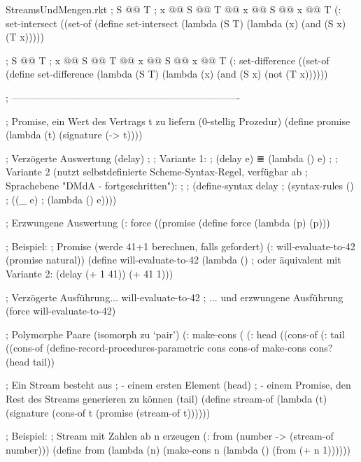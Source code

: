 \begin{filecontents*}{StreamsUndMengen.rkt}
; S @\latexcode{$\cap$}@ T
; x @\latexcode{$\in$}@ S @\latexcode{$\cap$}@ T @\latexcode{$\Leftrightarrow$}@ x @\latexcode{$\in$}@ S @\latexcode{$\land$}@ x @\latexcode{$\in$}@ T
(: set-intersect ((set-of %
(define set-intersect
  (lambda (S T)
    (lambda (x)
      (and (S x) (T x)))))

; S @\latexcode{$\setminus$}@ T
; x @\latexcode{$\in$}@ S @\latexcode{$\setminus$}@ T @\latexcode{$\Leftrightarrow$}@ x @\latexcode{$\in$}@ S @\latexcode{$\land$}@ x @\latexcode{$\not\in$}@ T
(: set-difference ((set-of %
(define set-difference
  (lambda (S T)
    (lambda (x)
      (and (S x) (not (T x))))))

; ----------------------------------------------------------------------

; Promise, ein Wert des Vertrags t zu liefern (0-stellig Prozedur)
(define promise
  (lambda (t)
    (signature (-> t))))

; Verzögerte Auswertung (delay)
;
; Variante 1: 
; (delay e) ≣ (lambda () e)
;
; Variante 2 (nutzt selbstdefinierte Scheme-Syntax-Regel, verfügbar ab
; Sprachebene "DMdA - fortgeschritten"):
;
; (define-syntax delay
;   (syntax-rules ()
;     ((_ e)
;      (lambda () e))))

; Erzwungene Auswertung
(: force ((promise %
(define force
  (lambda (p)
    (p)))

; Beispiel: 
; Promise (werde 41+1 berechnen, falls gefordert)
(: will-evaluate-to-42 (promise natural))
(define will-evaluate-to-42
  (lambda ()     ; oder äquivalent mit Variante 2: (delay (+ 1 41))
    (+ 41 1)))   

; Verzögerte Ausführung...
will-evaluate-to-42
; ... und erzwungene Ausführung
(force will-evaluate-to-42)

; Polymorphe Paare (isomorph zu `pair')
(: make-cons (%
(: head ((cons-of %
(: tail ((cons-of %
(define-record-procedures-parametric cons cons-of
  make-cons 
  cons?
  (head
   tail))

; Ein Stream besteht aus
; - einem ersten Element (head)
; - einem Promise, den Rest des Streams generieren zu können (tail)
(define stream-of
  (lambda (t)
    (signature (cons-of t (promise (stream-of t))))))

; Beispiel:
; Stream mit Zahlen ab n erzeugen
(: from (number -> (stream-of number)))
(define from
  (lambda (n)
    (make-cons n (lambda () (from (+ n 1))))))
  

\end{filecontents*}

